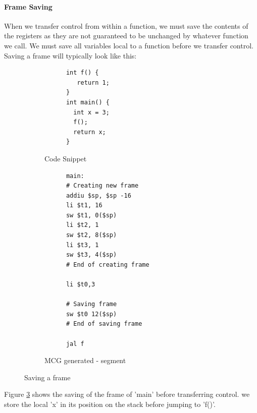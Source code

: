 \documentclass[12pt]{article}
\begin{document}
\paragraph{Frame Saving} When we transfer control from within a function, we must save the contents of the registers as they are not guaranteed to be unchanged by whatever function we call. We must save all variables local to a function before we transfer control. Saving a frame will typically look like this: 
\begin{figure}[H]
  \centering
  \begin{subfigure}{.5\textwidth}
    \centering
    \begin{verbatim}
      int f() {
         return 1;
      }
      int main() {
        int x = 3;
        f();
        return x;
      }
    \end{verbatim}
    \caption{Code Snippet}
    \label{code3}
  \end{subfigure}%
  \begin{subfigure}{.5\textwidth}
    \centering
    \begin{verbatim}
      main:
      # Creating new frame
      addiu $sp, $sp -16
      li $t1, 16
      sw $t1, 0($sp)
      li $t2, 1
      sw $t2, 8($sp)
      li $t3, 1
      sw $t3, 4($sp)
      # End of creating frame
      
      li $t0,3
      
      # Saving frame
      sw $t0 12($sp)
      # End of saving frame
      
      jal f
    \end{verbatim}
    \caption{MCG generated - segment}
    \label{savfram}
  \end{subfigure}
  \caption{Saving a frame}
  \label{frmsaving}
  \end{figure}
Figure \ref{frmsaving} shows the saving of the frame of 'main' before transferring control. we store the local 'x' in its position on the stack before jumping to 'f()'.
\end{document}
